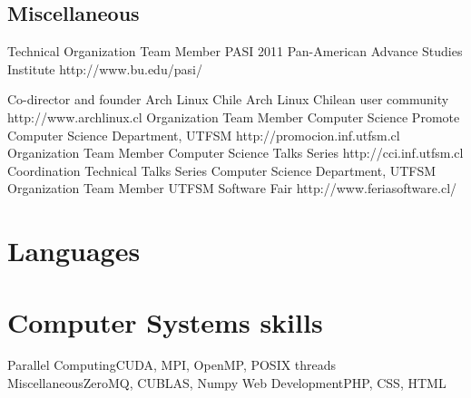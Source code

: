 \documentclass[11pt,a4paper]{moderncv}
\begin{document}
\subsection{Miscellaneous}
		{Technical Organization Team Member}
		{PASI 2011}
		{Pan-American Advance Studies Institute}
		{http://www.bu.edu/pasi/}
		{}

		{Co-director and founder}
		{Arch Linux Chile}
		{Arch Linux Chilean user community}
		{http://www.archlinux.cl}
		{}
		{Organization Team Member}
		{Computer Science Promote}
		{Computer Science Department, UTFSM}
		{http://promocion.inf.utfsm.cl}
		{}
		{Organization Team Member}
		{Computer Science Talks Series}
		{http://cci.inf.utfsm.cl}
		{}{}
		{Coordination}
		{Technical Talks Series}
		{Computer Science Department, UTFSM}
		{}{}
        {Organization Team Member}
        {UTFSM Software Fair}
        {http://www.feriasoftware.cl/}
        {}{}

\section{Languages}

\section{Computer Systems skills}
                {Parallel Computing}{CUDA, MPI, OpenMP, POSIX threads}
                {Miscellaneous}{ZeroMQ, CUBLAS, Numpy}
                {Web Development}{PHP, CSS, HTML}
\end{document}
